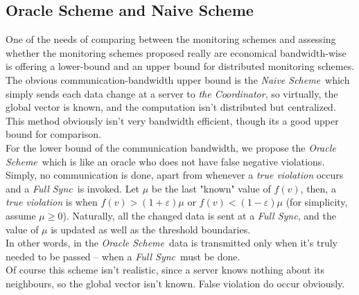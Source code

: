 \documentclass[10pt, conference]{IEEEtran}
\newcommand{\fullSync}{\textit{Full Sync}}
\newcommand{\naiveScheme}{\textit{Naive Scheme}}
\newcommand{\oracleScheme}{\textit{Oracle Scheme}}
\newcommand{\theCoordinator}{\textit{the Coordinator}}
\begin{document}
\subsection{Oracle Scheme and Naive Scheme}
One of the needs of comparing between the monitoring schemes and assessing whether the monitoring schemes proposed really are economical bandwidth-wise is offering a lower-bound and an upper bound for distributed monitoring schemes. \\
The obvious communication-bandwidth upper bound is the \naiveScheme \ which simply sends each data change at a server to \theCoordinator , so virtually, the global vector is known, and the computation isn't distributed but centralized. This method obviously isn't very bandwidth efficient, though its a good upper bound for comparison. \\
For the lower bound of the communication bandwidth, we propose the \oracleScheme \ which is like an oracle who does not have false negative violations. Simply, no communication is done, apart from whenever a \textit{true violation} occurs and a \fullSync \ is invoked. Let $\mu$ be the last "known" value of $f(v)$, then, a \textit{true violation} is when ${f(v) > (1
+\varepsilon)\mu}$ or ${f(v) < (1-\varepsilon)\mu}$ (for simplicity, assume ${\mu \geq 0}$). Naturally, all the changed data  is sent at a \fullSync , and the value of $\mu$ is updated as well as the threshold boundaries. \\
In other words, in the \oracleScheme \ data is transmitted only when it's truly needed to be passed -- when a \fullSync \ must be done. \\
Of course this scheme isn't realistic, since a server knows nothing about its neighbours, so the global vector isn't known. False violation do occur obviously. 
\end{document}
